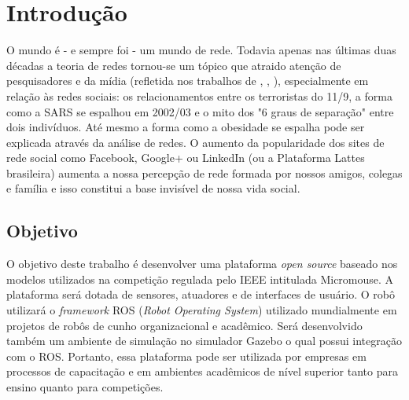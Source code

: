\chapter{Introdução}
\label{chap:intro}

O mundo \'e - e sempre foi - um mundo de rede. Todavia apenas nas \'ultimas duas d\'ecadas a teoria de redes tornou-se um t\'opico que atraido aten\c{c}\~ao de pesquisadores e da m\'idia (refletida nos trabalhos de \cite{Barabasi2003-1}, \cite{Watts2003}, \cite{NBW2006}), especialmente em rela\c{c}\~ao \`as redes sociais: os relacionamentos entre os terroristas do 11/9, a forma como a SARS se espalhou em 2002/03 e o mito dos "6 graus de separa\c{c}\~ao" entre dois indiv\'iduos. At\'e mesmo a forma como a obesidade se espalha pode ser explicada atrav\'es da an\'alise de redes. O aumento da popularidade dos sites de rede social como Facebook, Google+ ou LinkedIn (ou a Plataforma Lattes brasileira) aumenta a nossa percep\c{c}\~ao de rede formada por nossos amigos, colegas e fam\'ilia e isso constitui a base invis\'ivel de nossa vida social.

\section{Objetivo}
\label{sec:objetivo_geral}
O objetivo deste trabalho é desenvolver uma plataforma \textit{open source} baseado nos modelos utilizados na competição regulada pelo IEEE intitulada Micromouse. A plataforma será dotada de sensores, atuadores e de interfaces de usuário. O robô utilizará o \textit{framework} ROS (\textit{Robot Operating System}) utilizado mundialmente em projetos de robôs de cunho organizacional e acadêmico. Será desenvolvido também um ambiente de simulação no simulador Gazebo o qual possui integração com o ROS. Portanto, essa plataforma pode ser utilizada por empresas em processos de capacitação e em ambientes acadêmicos de nível superior tanto para ensino quanto para competições.

